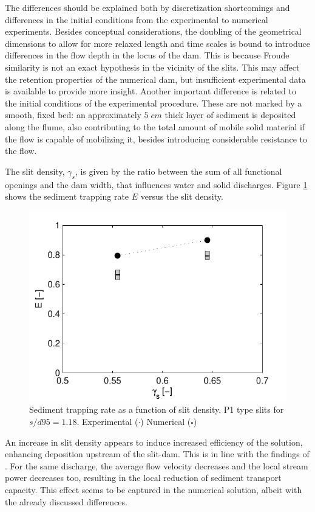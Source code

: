 The differences should be explained both by discretization shortcomings and differences in the initial conditions from the experimental to numerical experiments. Besides conceptual considerations, the doubling of the geometrical dimensions to allow for more relaxed length and time scales is bound to introduce differences in the flow depth in the locus of the dam. This is because Froude similarity is not an exact hypothesis in the vicinity of the slits. This may affect the retention properties of the numerical dam, but insufficient experimental data is available to provide more insight. Another important difference is related to the initial conditions of the experimental procedure. These are not marked by a smooth, fixed bed: an approximately $5\;cm$ thick layer of sediment is deposited along the flume, also contributing to the total amount of mobile solid material if the flow is capable of mobilizing it, besides introducing considerable resistance to the flow.

The slit density, $\gamma_s$, is given by the ratio between the sum of all functional openings and the dam width, that influences water and solid discharges. Figure \ref{fig:SD_P1} shows the sediment trapping rate $E$ versus the slit density.

%
\begin{figure}[ht!]
	\centering
	\includegraphics[width=0.50\linewidth]{Figures/6.Chapter/SD_P1}
	\caption{Sediment trapping rate as a function of slit density. P1 type slits for $s/d95=1.18$. Experimental ($\cdot$) Numerical ($\square$)}
	\label{fig:SD_P1} 
\end{figure}
%

An increase in slit density appears to induce increased efficiency of the solution, enhancing deposition upstream of the slit-dam. This is in line with the findings of \cite{Wenbing-2006}. For the same discharge, the average flow velocity decreases and the local stream power decreases too, resulting in the local reduction of sediment transport capacity. This effect seems to be captured in the numerical solution, albeit with the already discussed differences.







